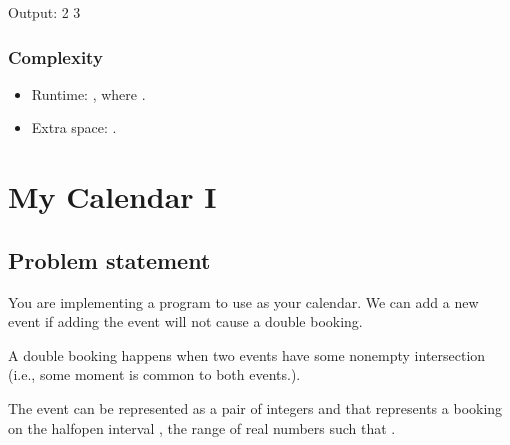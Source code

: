 \documentclass[letterpaper,12pt,english]{book}
\begin{document}
\begin{sphinxVerbatim}[commandchars=\\\{\}]
Output:
2
3
\end{sphinxVerbatim}


\subsubsection{Complexity}
\label{\detokenize{Sorting/04_SORT_287_Find_the_Duplicate_Number:id3}}\begin{itemize}
\item {} 
\sphinxAtStartPar
Runtime: , where .

\item {} 
\sphinxAtStartPar
Extra space: .

\end{itemize}

\sphinxstepscope


\section{My Calendar I}
\label{\detokenize{Sorting/04_SORT_729_My_Calendar_I:my-calendar-i}}\label{\detokenize{Sorting/04_SORT_729_My_Calendar_I::doc}}

\subsection{Problem statement\sphinxfootnotemark[85]}
\label{\detokenize{Sorting/04_SORT_729_My_Calendar_I:problem-statement}}%
\begin{footnotetext}[85]\sphinxAtStartFootnote
{}
%
\end{footnotetext}\ignorespaces 
\sphinxAtStartPar
You are implementing a program to use as your calendar. We can add a new event if adding the event will not cause a double booking.

\sphinxAtStartPar
A double booking happens when two events have some non\sphinxhyphen{}empty intersection (i.e., some moment is common to both events.).

\sphinxAtStartPar
The event can be represented as a pair of integers  and  that represents a booking on the half\sphinxhyphen{}open interval \sphinxcode{\sphinxupquote{{[}start, end)}}, the range of real numbers  such that .
\end{document}
